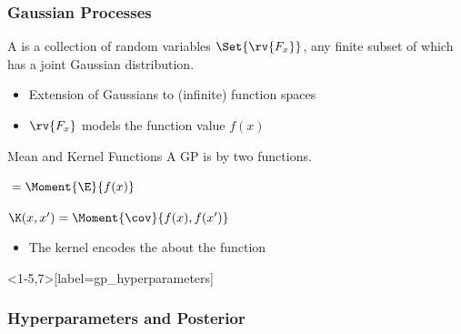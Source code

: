 \begin{frame}[label=gp_definition]
    \frametitle{Gaussian Processes}

    \begin{definition}
        A  is a collection of random variables $\Set{\rv{F_x}}$, any finite subset of which has a joint Gaussian distribution.
    \end{definition}
    \begin{itemize}
        \item Extension of Gaussians to (infinite) function spaces
        \item $\rv{F_x}$ models the function value $f(x)$
    \end{itemize}
    \vfill
    \pause
    \begin{block}{Mean and Kernel Functions}
        A GP is  by two functions.
        \medskip
        \begin{description}
            \item[Mean function] ${} = \Moment{\E}{f(x)}$
            \smallskip
            \item[Kernel function] $\K(x, x^\prime) = \Moment{\cov}{f(x), f(x^\prime)}$
        \end{description}
    \end{block}
    \begin{itemize}
        \item The kernel encodes the  about the function
    \end{itemize}
\end{frame}

\begin{frame}<1-5,7>[label=gp_hyperparameters]
    \frametitle{Hyperparameters and Posterior}

    \centering
\end{frame}

